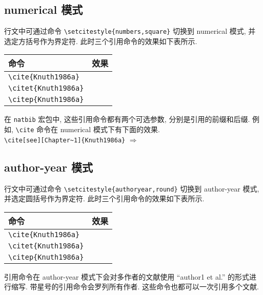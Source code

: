\subsection{numerical 模式}

行文中可通过命令 \verb|\setcitestyle{numbers,square}| 切换到 numerical 模式, 并选定方括号作为界定符. 此时三个引用命令的效果如下表所示.

\begin{center}
  \begin{tabular}{ll}
    \toprule
    命令                      & 效果\\
    \midrule
    \verb|\cite{Knuth1986a}|  & \cite{Knuth1986a}\\
    \verb|\citet{Knuth1986a}| & \citet{Knuth1986a}\\
    \verb|\citep{Knuth1986a}| & \citep{Knuth1986a}\\
    \bottomrule
  \end{tabular}
\end{center}

在 \verb|natbib| 宏包中, 这些引用命令都有两个可选参数, 分别是引用的前缀和后缀. 例如, \verb|\cite| 命令在 numerical 模式下有下面的效果.\\
\verb|\cite[see][Chapter~1]{Knuth1986a}| $\Rightarrow$ \cite[see][Chapter~1]{Knuth1986a}

\subsection{author-year 模式}

行文中可通过命令 \verb|\setcitestyle{authoryear,round}| 切换到 author-year 模式, 并选定圆括号作为界定符. 此时三个引用命令的效果如下表所示.

\begin{center}
  \begin{tabular}{ll}
    \toprule
    命令                      & 效果\\
    \midrule
    \verb|\cite{Knuth1986a}|  & \cite{Knuth1986a}\\
    \verb|\citet{Knuth1986a}| & \citet{Knuth1986a}\\
    \verb|\citep{Knuth1986a}| & \citep{Knuth1986a}\\
    \bottomrule
  \end{tabular}
\end{center}

引用命令在 author-year 模式下会对多作者的文献使用 ``author1 et al.'' 的形式进行缩写. 带星号的引用命令会罗列所有作者. 这些命令也都可以一次引用多个文献.

